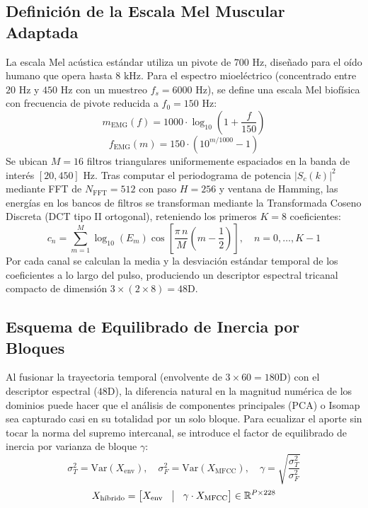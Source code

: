\subsection{Definición de la Escala Mel Muscular Adaptada}
La escala Mel acústica estándar utiliza un pivote de $700\text{ Hz}$, diseñado para el oído humano que opera hasta $8\text{ kHz}$. Para el espectro mioeléctrico (concentrado entre $20\text{ Hz}$ y $450\text{ Hz}$ con un muestreo $f_s = 6000\text{ Hz}$), se define una escala Mel biofísica con frecuencia de pivote reducida a $f_0 = 150\text{ Hz}$:
\begin{equation}
m_{\text{EMG}}(f) = 1000 \cdot \log_{10} \left( 1 + \frac{f}{150} \right)
\end{equation}
\begin{equation}
f_{\text{EMG}}(m) = 150 \cdot \left( 10^{m / 1000} - 1 \right)
\end{equation}
Se ubican $M = 16$ filtros triangulares uniformemente espaciados en la banda de interés $[20, 450]\text{ Hz}$. Tras computar el periodograma de potencia $|S_c(k)|^2$ mediante FFT de $N_{\text{FFT}} = 512$ con paso $H = 256$ y ventana de Hamming, las energías en los bancos de filtros se transforman mediante la Transformada Coseno Discreta (DCT tipo II ortogonal), reteniendo los primeros $K = 8$ coeficientes:
\begin{equation}
c_n = \sum_{m=1}^{M} \log_{10} \left( E_m \right) \cos \left[ \frac{\pi \, n}{M} \left( m - \frac{1}{2} \right) \right], \quad n = 0, \dots, K-1
\end{equation}
Por cada canal se calculan la media y la desviación estándar temporal de los coeficientes a lo largo del pulso, produciendo un descriptor espectral tricanal compacto de dimensión $3 \times (2 \times 8) = 48\text{D}$.

\subsection{Esquema de Equilibrado de Inercia por Bloques}
Al fusionar la trayectoria temporal (envolvente de $3 \times 60 = 180\text{D}$) con el descriptor espectral ($48\text{D}$), la diferencia natural en la magnitud numérica de los dominios puede hacer que el análisis de componentes principales (PCA) o Isomap sea capturado casi en su totalidad por un solo bloque. Para ecualizar el aporte sin tocar la norma del supremo intercanal, se introduce el factor de equilibrado de inercia por varianza de bloque $\gamma$:
\begin{equation}
\sigma_T^2 = \text{Var}(X_{\text{env}}), \quad \sigma_F^2 = \text{Var}(X_{\text{MFCC}}), \quad \gamma = \sqrt{\frac{\sigma_T^2}{\sigma_F^2}}
\end{equation}
\begin{equation}
X_{\text{híbrido}} = \begin{bmatrix} X_{\text{env}} & \vline & \gamma \cdot X_{\text{MFCC}} \end{bmatrix} \in \mathbb{R}^{P \times 228}
\end{equation}

